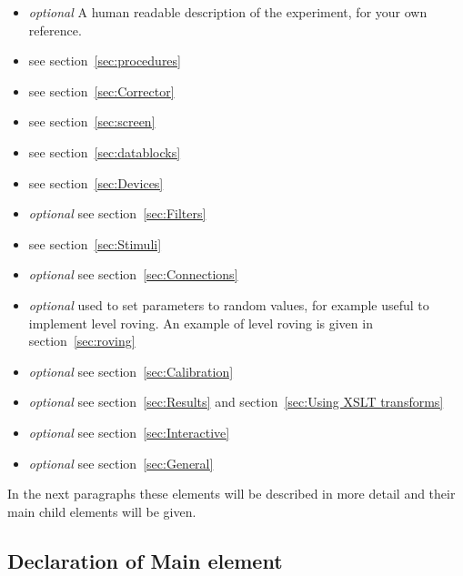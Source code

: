 \begin{itemize}
\item {} \emph{optional} A human readable description of the experiment, for your own reference.

\item {} see section~\ref{sec:procedures}

\item {} see section~\ref{sec:Corrector}

\item {} see section~\ref{sec:screen}

\item {} see section~\ref{sec:datablocks}

\item {} see section~\ref{sec:Devices}

\item {} \emph{optional} see
section~\ref{sec:Filters}

\item {} see section~\ref{sec:Stimuli}

\item {} \emph{optional} see
section~\ref{sec:Connections}

\item {} \emph{optional} used to set
parameters to random values, for example useful to implement level
roving. An example of level roving is given in
section~\ref{sec:roving}

\item {} \emph{optional} see
section~\ref{sec:Calibration}

\item {}\emph{optional} see
section~\ref{sec:Results} and section~\ref{sec:Using XSLT
transforms}


\item {}\emph{optional} see
section~\ref{sec:Interactive}

\item {}\emph{optional} see
section~\ref{sec:General}
\end{itemize}

In the next paragraphs these elements will be described in more
detail and their main child elements will be given.

\subsection{Declaration of Main  element}

